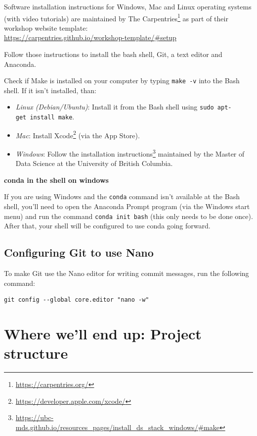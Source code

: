 \documentclass[
]{krantz}
\providecommand{\tightlist}{%
  \setlength{\itemsep}{0pt}\setlength{\parskip}{0pt}}
\renewenvironment{quote}{\begin{VF}}{\end{VF}}
\renewcommand{\href}[2]{#2\footnote{\url{#1}}}
\begin{document}
Software installation instructions for Windows, Mac and Linux operating systems
(with video tutorials) are maintained by \href{https://carpentries.org/}{The Carpentries}
as part of their workshop website template:\\
\url{https://carpentries.github.io/workshop-template/\#setup}

Follow those instructions to install the bash shell, Git, a text editor and Anaconda.

Check if Make is installed on your computer by typing \texttt{make\ -v} into the Bash
shell. If it isn't installed, than:

\begin{itemize}
\tightlist
\item
  \emph{Linux (Debian/Ubuntu)}: Install it from the Bash shell using \texttt{sudo\ apt-get\ install\ make}.
\item
  \emph{Mac}: Install \href{https://developer.apple.com/xcode/}{Xcode} (via the App Store).
\item
  \emph{Windows}: Follow the \href{https://ubc-mds.github.io/resources_pages/install_ds_stack_windows/\#make}{installation instructions} maintained by the
  Master of Data Science at the University of British Columbia.
\end{itemize}

\begin{quote}
\textbf{conda in the shell on windows}

If you are using Windows and the \texttt{conda} command isn't available at the Bash shell,
you'll need to open the Anaconda Prompt program (via the Windows start menu)
and run the command \texttt{conda\ init\ bash} (this only needs to be done once).
After that, your shell will be configured to use conda going forward.
\end{quote}

\hypertarget{install-git-nano}{%
\subsection{Configuring Git to use Nano}\label{install-git-nano}}

To make Git use the Nano editor for writing commit messages,
run the following command:

\begin{verbatim}
git config --global core.editor "nano -w"
\end{verbatim}

\hypertarget{intro-structure}{%
\section{Where we'll end up: Project structure}\label{intro-structure}}
\end{document}
